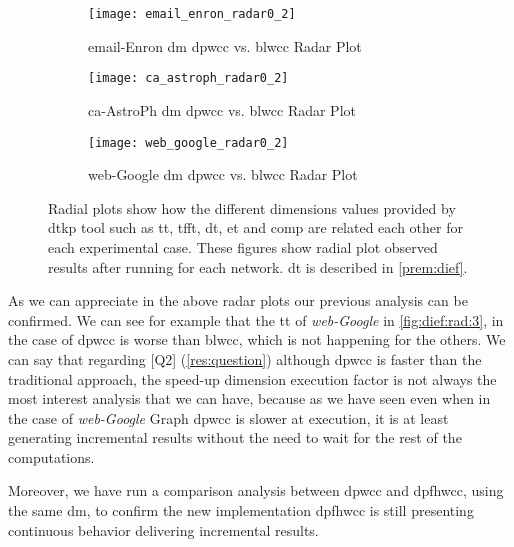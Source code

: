 \begin{figure}[!htp]
  \centering
  \begin{subfigure}[t]{0.3\textwidth}
   \texttt{[image: email\_enron\_radar0\_2]}
   \caption{email-Enron \acrlong{dm} \acrshort{dpwcc} vs. \acrshort{blwcc} Radar Plot}
   \label{fig:dief:rad:1}
  \end{subfigure}\hfill
  \begin{subfigure}[t]{0.3\textwidth}
   \texttt{[image: ca\_astroph\_radar0\_2]}
   \caption{ca-AstroPh \acrlong{dm} \acrshort{dpwcc} vs. \acrshort{blwcc} Radar Plot}
   \label{fig:dief:rad:2}
  \end{subfigure}\hfill
  \begin{subfigure}[t]{0.3\textwidth}
   \texttt{[image: web\_google\_radar0\_2]}
   \caption{web-Google \acrlong{dm} \acrshort{dpwcc} vs. \acrshort{blwcc} Radar Plot}
   \label{fig:dief:rad:3}
  \end{subfigure}\hfill
   \caption{Radial plots show how the different dimensions values provided by \acrshort{dtkp} tool such as \acrshort{tt}, \acrshort{tfft}, \acrshort{dt}, \acrshort{et} and \acrshort{comp} are related each other for each experimental case. These figures show radial plot observed results after running for each network. \acrshort{dt} is described in \autoref{prem:dief}.}
   \label{fig:dief:radial:old:all}
 \end{figure}

As we can appreciate in the above radar plots our previous analysis can be confirmed. We can see for example that the \acrlong{tt} of \emph{web-Google} in \autoref{fig:dief:rad:3}, in the case of \acrshort{dpwcc} is worse than \acrshort{blwcc}, which is not happening for the others.
We can say that regarding [Q2] (\autoref{res:question}) although \acrshort{dpwcc} is faster than the traditional approach, the speed-up dimension execution factor is not always the most interest analysis that we can have, because as we have seen even when in the case of \emph{web-Google} Graph \acrshort{dpwcc} is slower at execution, it is at least generating incremental results without the need to wait for the rest of the computations.

Moreover, we have run a comparison analysis between \acrshort{dpwcc} and \acrshort{dpfhwcc}, using the same \acrlong{dm}, to confirm the new implementation \acrshort{dpfhwcc} is still presenting continuous behavior delivering incremental results.


